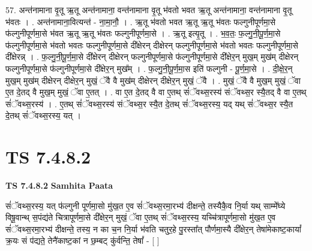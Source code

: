 \documentclass[17pt]{extarticle}
\begin{document}
57. अन्त॑नामाना वृ॒तू ऋ॒तू अन्त॑नामाना॒ वन्त॑नामाना वृ॒तू भ॑वतो भवत ऋ॒तू अन्त॑नामाना॒ वन्त॑नामाना वृ॒तू भ॑वतः । . अन्त॑नामाना॒वित्यन्त॑ - ना॒मा॒नौ॒ । . ऋ॒तू भ॑वतो भवत ऋ॒तू ऋ॒तू भ॑वतः फल्गुनीपूर्णमा॒से फ॑ल्गुनीपूर्णमा॒से भ॑वत ऋ॒तू ऋ॒तू भ॑वतः फल्गुनीपूर्णमा॒से । . ऋ॒तू इत्यृ॒तू । . भ॒व॒तः॒ फ॒ल्गु॒नी॒पू॒र्ण॒मा॒से फ॑ल्गुनीपूर्णमा॒से भ॑वतो भवतः फल्गुनीपूर्णमा॒से दी᳚क्षेरन् दीक्षेरन् फल्गुनीपूर्णमा॒से भ॑वतो भवतः फल्गुनीपूर्णमा॒से दी᳚क्षेरन्न् । . फ॒ल्गु॒नी॒पू॒र्ण॒मा॒से दी᳚क्षेरन् दीक्षेरन् फल्गुनीपूर्णमा॒से फ॑ल्गुनीपूर्णमा॒से दी᳚क्षेर॒न् मुख॒म् मुख॑म् दीक्षेरन् फल्गुनीपूर्णमा॒से फ॑ल्गुनीपूर्णमा॒से दी᳚क्षेर॒न् मुख᳚म् । . फ॒ल्गु॒नी॒पू॒र्ण॒मा॒स इति॑ फल्गुनी - पू॒र्ण॒मा॒से । . दी॒क्षे॒र॒न् मुख॒म् मुख॑म् दीक्षेरन् दीक्षेर॒न् मुखं॒ ॅवै वै मुख॑म् दीक्षेरन् दीक्षेर॒न् मुखं॒ ॅवै । . मुखं॒ ॅवै वै मुख॒म् मुखं॒ ॅवा ए॒त दे॒तद् वै मुख॒म् मुखं॒ ॅवा ए॒तत् । . वा ए॒त दे॒तद् वै वा ए॒तथ् सं॑ॅवथ्स॒रस्य॑ संॅवथ्स॒र स्यै॒तद् वै वा ए॒तथ् सं॑ॅवथ्स॒रस्य॑ । . ए॒तथ् सं॑ॅवथ्स॒रस्य॑ संॅवथ्स॒र स्यै॒त दे॒तथ् सं॑ॅवथ्स॒रस्य॒ यद् यथ् सं॑ॅवथ्स॒र स्यै॒त दे॒तथ् सं॑ॅवथ्स॒रस्य॒ यत् । \newline
\pagebreak
{}

\section{ TS 7.4.8.2 }

\textbf{TS 7.4.8.2 } \newline
\textbf{Samhita Paata} \newline

सं॑ॅवथ्स॒रस्य॒ यत् फ॑ल्गुनी पूर्णमा॒सो मु॑ख॒त ए॒व सं॑ॅवथ्स॒रमा॒रभ्य॑ दीक्षन्ते॒ तस्यैकै॒व नि॒र्या यथ् साम्मे᳚घ्ये विषू॒वान्थ् स॒पंद्य॑ते चित्रापूर्णमा॒से दी᳚क्षेर॒न् मुखं॒ ॅवा ए॒तथ् सं॑ॅवथ्स॒रस्य॒ यच्चि॑त्रापूर्णमा॒सो मु॑ख॒त ए॒व सं॑ॅवथ्स॒रमा॒रभ्य॑ दीक्षन्ते॒ तस्य॒ न का च॒न नि॒र्या भ॑वति चतुर॒हे पु॒रस्ता᳚त् पौर्णमा॒स्यै दी᳚क्षेर॒न् तेषा॑मेकाष्ट॒कायां᳚ क्र॒यः सं प॑द्यते॒ तेनै॑काष्ट॒कां न छ॒म्बट् कु॑र्वन्ति॒ तेषां᳚ - [  ] \newline
\end{document}
